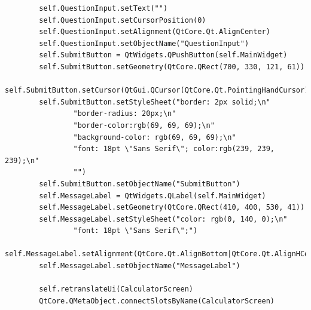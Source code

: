 \documentclass{article}
\begin{document}
\begin{lstlisting}
        self.QuestionInput.setText("")
        self.QuestionInput.setCursorPosition(0)
        self.QuestionInput.setAlignment(QtCore.Qt.AlignCenter)
        self.QuestionInput.setObjectName("QuestionInput")
        self.SubmitButton = QtWidgets.QPushButton(self.MainWidget)
        self.SubmitButton.setGeometry(QtCore.QRect(700, 330, 121, 61))
        self.SubmitButton.setCursor(QtGui.QCursor(QtCore.Qt.PointingHandCursor))
        self.SubmitButton.setStyleSheet("border: 2px solid;\n"
                "border-radius: 20px;\n"
                "border-color:rgb(69, 69, 69);\n"
                "background-color: rgb(69, 69, 69);\n"
                "font: 18pt \"Sans Serif\"; color:rgb(239, 239, 239);\n"
                "")
        self.SubmitButton.setObjectName("SubmitButton")
        self.MessageLabel = QtWidgets.QLabel(self.MainWidget)
        self.MessageLabel.setGeometry(QtCore.QRect(410, 400, 530, 41))
        self.MessageLabel.setStyleSheet("color: rgb(0, 140, 0);\n"
                "font: 18pt \"Sans Serif\";")
        self.MessageLabel.setAlignment(QtCore.Qt.AlignBottom|QtCore.Qt.AlignHCenter)
        self.MessageLabel.setObjectName("MessageLabel")

        self.retranslateUi(CalculatorScreen)
        QtCore.QMetaObject.connectSlotsByName(CalculatorScreen)


\end{lstlisting}
\end{document}
